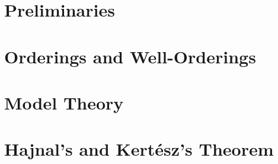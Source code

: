 \documentclass[a4paper,12pt]{memoir}
\numberwithin{equation}{section} %
\theoremstyle{plain} %
\theoremstyle{definition} %
\theoremstyle{remark} %
\begin{document}
\chapter{Preliminaries}\label{preliminaries}


\chapter{Orderings and Well-Orderings}\label{orderings}


\chapter{Model Theory}\label{model-theory}


\chapter{Hajnal's and Kertész's Theorem}




\appendix %


\backmatter


%
%
\printbibliography

\end{document}
